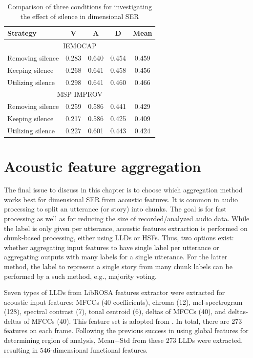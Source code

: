 \begin{table}
  \caption{Comparison of three conditions for investigating the effect of silence in dimensional SER}
  \begin{center}
    \begin{tabular}{l c c c c}
      \hline
Strategy &  V & A & D & Mean \\
\hline \hline
\multicolumn{5}{c}{IEMOCAP} \\
      \hline
Removing silence  & 0.283 & 0.640 & 0.454 & 0.459 \\
Keeping silence & 0.268 & 0.641 & 0.458 & 0.456 \\
Utilizing silence & 0.298 & 0.641 & 0.460 & 0.466 \\
      \hline
\multicolumn{5}{c}{MSP-IMPROV}  \\
      \hline      
Removing silence  & 0.259 & 0.586 & 0.441 & 0.429 \\
Keeping silence & 0.217 & 0.586 & 0.425 & 0.409 \\
Utilizing silence & 0.227 & 0.601 & 0.443 & 0.424 \\
      \hline
    \end{tabular}
  \end{center}
  \label{tab:saf_recap}
\end{table}

\section{Acoustic feature aggregation}
The final issue to discuss in this chapter is to choose which aggregation
method works best for dimensional SER from acoustic features. It is common in
audio processing to split an utterance (or story) into chunks. The goal is for
fast processing as well as for reducing the size of recorded/analyzed audio
data. While the label is only given per utterance, acoustic features extraction
is performed on chunk-based processing, either using LLDs or HSFs. Thus, two
options exist: whether aggregating input features to have single label per
utterance or aggregating outputs with many labels for a single utterance. For
the latter method, the label to represent a single story from many chunk labels
can be performed by a such method, e.g., majority voting.  

Seven types of LLDs from LibROSA features extractor \cite{McFee2020} were
extracted for acoustic input features: MFCCs (40 coefficients), chroma (12),
mel-spectrogram (128), spectral contrast (7), tonal centroid (6), deltas of
MFCCs (40), and deltas-deltas of MFCCs (40).  This feature set is adopted from
\cite{Atmaja2020j}. In total, there are 273 features on each frame. Following
the previous success in using global features for determining region of
analysis, Mean+Std from these 273 LLDs were extracted, resulting in
546-dimensional functional features.

